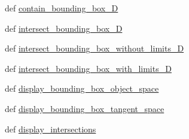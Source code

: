 \begin{DoxyCompactItemize}
\item 
def \hyperlink{classdestruction_1_1_bounding_box_1_1_bounding_box2_d_ae7697da594cfcabb7a3a411074036c84}{contain\-\_\-bounding\-\_\-box\-\_\-D}
\item 
def \hyperlink{classdestruction_1_1_bounding_box_1_1_bounding_box2_d_a26a157616ee3cf937f2c06719e05f324}{intersect\-\_\-bounding\-\_\-box\-\_\-D}
\item 
def \hyperlink{classdestruction_1_1_bounding_box_1_1_bounding_box2_d_ae630758983a19c99bf0e8e6b4856bd67}{intersect\-\_\-bounding\-\_\-box\-\_\-without\-\_\-limits\-\_\-D}
\item 
def \hyperlink{classdestruction_1_1_bounding_box_1_1_bounding_box2_d_a01a57d62e77b595e57cb9d221c893491}{intersect\-\_\-bounding\-\_\-box\-\_\-with\-\_\-limits\-\_\-D}
\item 
def \hyperlink{classdestruction_1_1_bounding_box_1_1_bounding_box2_d_aa77e18d82effb3d1714f6f7279335735}{display\-\_\-bounding\-\_\-box\-\_\-object\-\_\-space}
\item 
def \hyperlink{classdestruction_1_1_bounding_box_1_1_bounding_box2_d_a6bb403d9c25c925d632eab55545a1c81}{display\-\_\-bounding\-\_\-box\-\_\-tangent\-\_\-space}
\item 
def \hyperlink{classdestruction_1_1_bounding_box_1_1_bounding_box2_d_a3ad1e672b5e075496fe1ce0c1c80e12f}{display\-\_\-intersections}
\end{DoxyCompactItemize}
